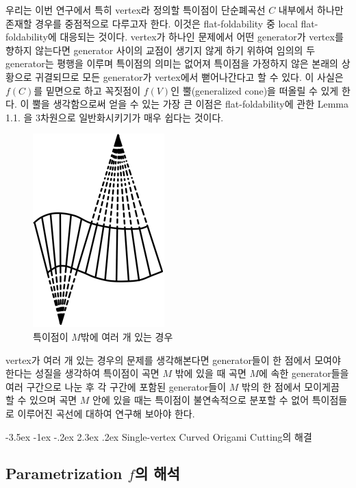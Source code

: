 \documentclass[11pt]{article}
\makeatletter
\renewcommand\section{\@startsection {section}{1}{\z@}%
                                   {-3.5ex \@plus -1ex \@minus -.2ex}%
                                   {2.3ex \@plus.2ex}%
                                   {\normalfont\large\sffamily\bfseries}}
\makeatother
\begin{document}
우리는 이번 연구에서 특히 vertex라 정의할 특이점이 단순폐곡선 $C$ 내부에서 하나만 존재할 경우를 중점적으로 다루고자 한다. 이것은 flat-foldability 중 local flat-foldability에 대응되는 것이다. vertex가 하나인 문제에서 어떤 generator가 vertex를 향하지 않는다면 generator 사이의 교점이 생기지 않게 하기 위하여 임의의 두 generator는 평행을 이루며 특이점의 의미는 없어져 특이점을 가정하지 않은 본래의 상황으로 귀결되므로 모든 generator가 vertex에서 뻗어나간다고 할 수 있다. 이 사실은 $f(C)$를 밑면으로 하고 꼭짓점이 $f(V)$인 뿔(generalized cone)을 떠올릴 수 있게 한다. 이 뿔을 생각함으로써 얻을 수 있는 가장 큰 이점은 flat-foldability에 관한 Lemma 1.1. 을 3차원으로 일반화시키기가 매우 쉽다는 것이다.


\begin{figure}
\centering
\includegraphics{4.png}
\caption{특이점이 $M$밖에 여러 개 있는 경우}
\end{figure}


vertex가 여러 개 있는 경우의 문제를 생각해본다면 generator들이 한 점에서 모여야 한다는 성질을 생각하여 특이점이 곡면 $M$ 밖에 있을 때 곡면 $M$에 속한 generator들을 여러 구간으로 나눈 후 각 구간에 포함된 generator들이 $M$ 밖의 한 점에서 모이게끔 할 수 있으며 곡면 $M$ 안에 있을 때는 특이점이 불연속적으로 분포할 수 없어 특이점들로 이루어진 곡선에 대하여 연구해 보아야 한다.







\section{Single-vertex Curved Origami Cutting의 해결}
\subsection{Parametrization $f$의 해석}
\end{document}
